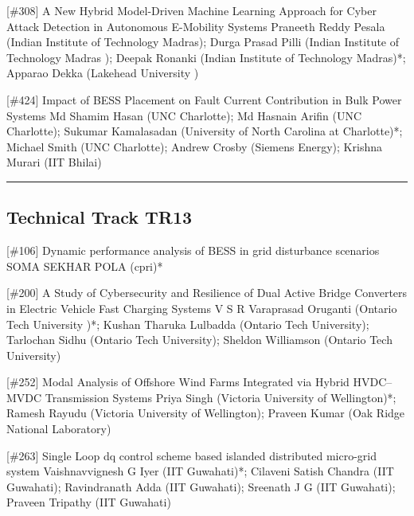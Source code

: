 {} \begin{abstract_online} {[\#308] A New Hybrid Model-Driven Machine Learning Approach for Cyber Attack Detection in Autonomous E-Mobility Systems} {} {Praneeth Reddy Pesala (Indian Institute of Technology Madras); Durga Prasad Pilli (Indian Institute of Technology Madras ); Deepak  Ronanki (Indian Institute of Technology Madras)*; Apparao  Dekka (Lakehead University )} {}  \end{abstract_online} 
{} \begin{abstract_online} {[\#424] Impact of BESS Placement on Fault Current Contribution in Bulk Power Systems} {} {Md Shamim  Hasan (UNC Charlotte); Md Hasnain  Arifin (UNC Charlotte); Sukumar Kamalasadan (University of North Carolina at Charlotte)*; Michael Smith (UNC Charlotte); Andrew Crosby (Siemens Energy); Krishna Murari (IIT Bhilai)} {}  \end{abstract_online} 
\hrule  \subsection{Technical Track TR13}\nopagebreak {} \begin{abstract_online} {[\#106] Dynamic performance analysis of BESS in grid disturbance scenarios} {} {SOMA SEKHAR POLA (cpri)*} {}  \end{abstract_online} 
{} \begin{abstract_online} {[\#200] A Study of Cybersecurity and Resilience of Dual Active Bridge Converters in Electric Vehicle Fast Charging Systems} {} {V S R Varaprasad  Oruganti (Ontario Tech University )*; Kushan Tharuka  Lulbadda (Ontario Tech University); Tarlochan  Sidhu (Ontario Tech University); Sheldon Williamson (Ontario Tech University)} {}  \end{abstract_online} 
{} \begin{abstract_online} {[\#252] Modal Analysis of Offshore Wind Farms Integrated via Hybrid HVDC–MVDC Transmission Systems} {} {Priya Singh (Victoria University of Wellington)*; Ramesh Rayudu (Victoria University of Wellington); Praveen Kumar (Oak Ridge National Laboratory)} {}  \end{abstract_online} 
{} \begin{abstract_online} {[\#263] Single Loop dq control scheme based islanded distributed micro-grid system} {} {Vaishnavvignesh G Iyer (IIT Guwahati)*; Cilaveni Satish Chandra (IIT Guwahati); Ravindranath  Adda (IIT Guwahati); Sreenath J G (IIT Guwahati); Praveen  Tripathy (IIT Guwahati)} {}  \end{abstract_online} 
